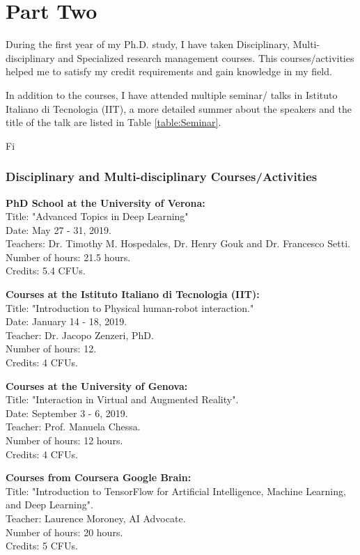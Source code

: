 \chapter{Part Two}

During the first year of my Ph.D. study, I have taken Disciplinary, Multi-disciplinary and Specialized research management courses. This courses/activities helped me to satisfy my credit requirements and gain knowledge in my field.

In addition to the courses, I have attended multiple seminar/ talks in Istituto Italiano di Tecnologia (IIT), a more detailed summer about the speakers and the title of the talk are listed in Table \ref{table:Seminar}.

Fi

\subsection{Disciplinary and Multi-disciplinary Courses/Activities}

\textbf{PhD School at the University of Verona:}\\
Title: "Advanced Topics in Deep Learning"\\
Date:  May 27 - 31, 2019.\\
Teachers: Dr. Timothy M. Hospedales, Dr. Henry Gouk  and Dr. Francesco Setti.\\
Number of hours: 21.5 hours.\\ 
Credits: 5.4 CFUs.

\textbf{Courses at the Istituto Italiano di Tecnologia (IIT):}\\
Title: "Introduction to Physical human-robot interaction." \\
Date: January 14 - 18, 2019.\\ 
Teacher: Dr. Jacopo Zenzeri, PhD. \\
Number of hours: 12.\\
Credits: 4 CFUs. 

\textbf{Courses at the University of Genova:}\\
Title: "Interaction in Virtual and Augmented Reality".\\
Date: September 3 - 6, 2019. \\
Teacher: Prof. Manuela Chessa. \\
Number of hours: 12 hours. \\
Credits: 4 CFUs. 

\textbf{Courses from Coursera Google Brain:}\\
Title: "Introduction to TensorFlow for Artificial Intelligence, Machine Learning, and Deep Learning". \\ 
Teacher: Laurence Moroney, AI Advocate.\\
Number of hours: 20 hours.\\
Credits: 5 CFUs.


